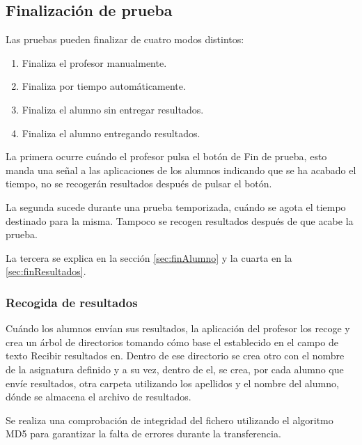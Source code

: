 \documentclass[11pt]{article}
\begin{document}
\subsection{Finalización de prueba}
\label{sec:finalizacionPrueba}

Las pruebas pueden finalizar de cuatro modos distintos:

\begin{enumerate}

    \item Finaliza el profesor manualmente.

    \item Finaliza por tiempo automáticamente.

    \item Finaliza el alumno sin entregar resultados.

    \item Finaliza el alumno entregando resultados.

\end{enumerate}

La primera ocurre cuándo el profesor pulsa el botón de Fin de prueba, esto manda una señal a las aplicaciones de los alumnos indicando que se ha acabado el tiempo, no se recogerán resultados después de pulsar el botón.

La segunda sucede durante una prueba temporizada, cuándo se agota el tiempo destinado para la misma. Tampoco se recogen resultados después de que acabe la prueba.

La tercera se explica en la sección \ref{sec:finAlumno} y la cuarta en la \ref{sec:finResultados}.

\subsubsection{Recogida de resultados}

Cuándo los alumnos envían sus resultados, la aplicación del profesor los recoge y crea un árbol de directorios tomando cómo base el establecido en el campo de texto Recibir resultados en. Dentro de ese directorio se crea otro con el nombre de la asignatura definido y a su vez, dentro de el, se crea, por cada alumno que envíe resultados, otra carpeta utilizando los apellidos y el nombre del alumno, dónde se almacena el archivo de resultados.

Se realiza una comprobación de integridad del fichero utilizando el algoritmo MD5 para garantizar la falta de errores durante la transferencia.

\newpage
\end{document}
